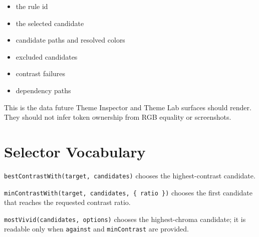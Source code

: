 \begin{itemize}
\tightlist
\item
  the rule id
\item
  the selected candidate
\item
  candidate paths and resolved colors
\item
  excluded candidates
\item
  contrast failures
\item
  dependency paths
\end{itemize}

This is the data future Theme Inspector and Theme Lab surfaces should render. They should not infer token ownership from RGB equality or screenshots.

\section{Selector Vocabulary}\label{record-027-selector-vocabulary}

\texttt{b\allowbreak{}e\allowbreak{}s\allowbreak{}t\allowbreak{}C\allowbreak{}o\allowbreak{}n\allowbreak{}t\allowbreak{}r\allowbreak{}a\allowbreak{}s\allowbreak{}t\allowbreak{}W\allowbreak{}i\allowbreak{}t\allowbreak{}h\allowbreak{}(\allowbreak{}t\allowbreak{}a\allowbreak{}r\allowbreak{}g\allowbreak{}e\allowbreak{}t\allowbreak{},\allowbreak{} \allowbreak{}c\allowbreak{}a\allowbreak{}n\allowbreak{}d\allowbreak{}i\allowbreak{}d\allowbreak{}a\allowbreak{}t\allowbreak{}e\allowbreak{}s\allowbreak{})} chooses the highest-contrast candidate.

\texttt{m\allowbreak{}i\allowbreak{}n\allowbreak{}C\allowbreak{}o\allowbreak{}n\allowbreak{}t\allowbreak{}r\allowbreak{}a\allowbreak{}s\allowbreak{}t\allowbreak{}W\allowbreak{}i\allowbreak{}t\allowbreak{}h\allowbreak{}(\allowbreak{}t\allowbreak{}a\allowbreak{}r\allowbreak{}g\allowbreak{}e\allowbreak{}t\allowbreak{},\allowbreak{} \allowbreak{}c\allowbreak{}a\allowbreak{}n\allowbreak{}d\allowbreak{}i\allowbreak{}d\allowbreak{}a\allowbreak{}t\allowbreak{}e\allowbreak{}s\allowbreak{},\allowbreak{} \allowbreak{}\{\allowbreak{} \allowbreak{}r\allowbreak{}a\allowbreak{}t\allowbreak{}i\allowbreak{}o\allowbreak{} \allowbreak{}\}\allowbreak{})} chooses the first candidate that reaches the requested contrast ratio.

\texttt{m\allowbreak{}o\allowbreak{}s\allowbreak{}t\allowbreak{}V\allowbreak{}i\allowbreak{}v\allowbreak{}i\allowbreak{}d\allowbreak{}(\allowbreak{}c\allowbreak{}a\allowbreak{}n\allowbreak{}d\allowbreak{}i\allowbreak{}d\allowbreak{}a\allowbreak{}t\allowbreak{}e\allowbreak{}s\allowbreak{},\allowbreak{} \allowbreak{}o\allowbreak{}p\allowbreak{}t\allowbreak{}i\allowbreak{}o\allowbreak{}n\allowbreak{}s\allowbreak{})} chooses the highest-chroma candidate; it is readable only when \texttt{a\allowbreak{}g\allowbreak{}a\allowbreak{}i\allowbreak{}n\allowbreak{}s\allowbreak{}t} and \texttt{m\allowbreak{}i\allowbreak{}n\allowbreak{}C\allowbreak{}o\allowbreak{}n\allowbreak{}t\allowbreak{}r\allowbreak{}a\allowbreak{}s\allowbreak{}t} are provided.

